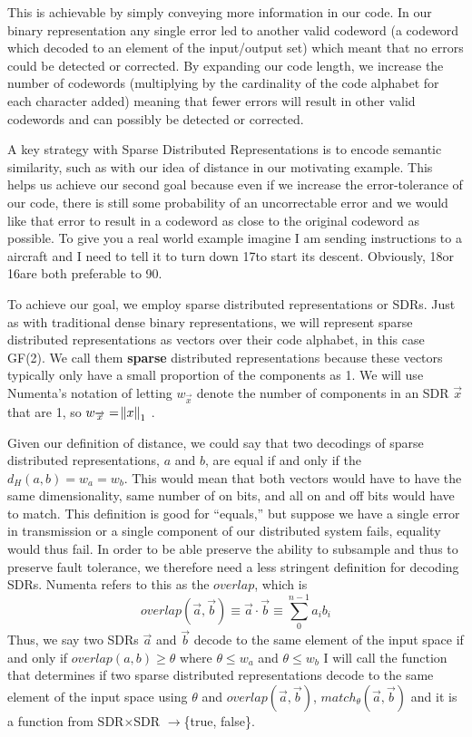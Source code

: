 \documentclass[fleqn,notitlepage,minimal]{article}
\begin{document}
	This is achievable by simply conveying more information in our code. In our binary representation any single error led to another valid codeword (a codeword which decoded to an element of the input/output set) which meant that no errors could be detected or corrected. By expanding our code length, we increase the number of codewords (multiplying by the cardinality of the code alphabet for each character added) meaning that fewer errors will result in other valid codewords and can possibly be detected or corrected. 
	
	A key strategy with Sparse Distributed Representations is to encode semantic similarity, such as with our idea of distance in our motivating example. This helps us achieve our second goal because even if we increase the error-tolerance of our code, there is still some probability of an uncorrectable error and we would like that error to result in a codeword as close to the original codeword as possible. To give you a real world example imagine I am sending instructions to a aircraft and I need to tell it to turn down 17\textdegree to start its descent. Obviously, 18\textdegree or 16\textdegree are both preferable to 90\textdegree.
	
	To achieve our goal, we employ sparse distributed representations or SDRs. Just as with traditional dense binary representations, we will represent sparse distributed representations as vectors over their code alphabet, in this case GF(2). We call them \textbf{sparse} distributed representations because these vectors typically only have a small proportion of the components as 1. We will use Numenta's notation of letting $w_{\overrightarrow{x}}$ denote the number of components in an SDR $\overrightarrow{x}$ that are 1, so $w_{\overrightarrow{x}} = \norm{x}_{1}$ \cite{Properties}.
	
	Given our definition of distance, we could say that two decodings of sparse distributed representations, $a$ and $b$, are equal if and only if the $d_{H}(a,b) = w_{a} = w_{b}$. This would mean that both vectors would have to have the same dimensionality, same number of on bits, and all on and off bits would have to match. This definition is good for ``equals,'' but suppose we have a single error in transmission or a single component of our distributed system fails, equality would thus fail. In order to be able preserve the ability to subsample and thus to preserve fault tolerance, we therefore need a less stringent definition for decoding SDRs. Numenta refers to this as the $overlap$, which is $$ overlap(\overrightarrow{a}, \overrightarrow{b}) \equiv \overrightarrow{a} \cdot \overrightarrow{b} \equiv \sum_{0}^{n-1} a_{i}b_{i}$$ Thus, we say two SDRs $\overrightarrow{a}$ and $\overrightarrow{b}$ decode to the same element of the input space if and only if $overlap(a,b) \geq \theta$ where $\theta \leq w_{a}$ and $\theta \leq w_{b}$ \cite{Properties} I will call the function that determines if two sparse distributed representations decode to the same element of the input space using $\theta$ and $overlap(\overrightarrow{a}, \overrightarrow{b})$, $match_{\theta}(\overrightarrow{a}, \overrightarrow{b})$ and it is a function from SDR$\times$SDR $\longrightarrow$\{true, false\}.
	
\end{document}
